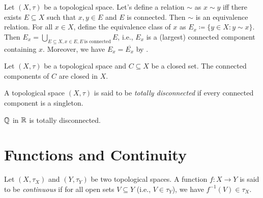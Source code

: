 \documentclass[screen]{techreport}
\numberwithin{equation}{section}
\begin{document}
\begin{definition}\label{De:ConnEquivalenceRelation}
	Let $(X,\tau)$ be a topological space.
	Let's define a relation ${\sim}$ as $x \sim y$ iff there exists $E \subseteq X$ such that $x,y\in E$ and $E$ is connected.
	Then ${\sim}$ is an equivalence relation.
	For all $x \in X$, define the equivalence class of $x$ as $E_x \coloneqq \{ y \in X : y \sim x \}$.
	Then $E_x = \bigcup_{E \subseteq X, x \in E, E~\text{is connected}} E$, i.e., $E_x$ is a (largest) connected component containing $x$.
	Moreover, we have $E_x = \overline{E_x}$ by .
\end{definition}

\begin{proposition}\label{Prop:ClosedConnComponentStillClosed}
	Let $(X,\tau)$ be a topological space and $C \subseteq X$ be a closed set.
	The connected components of $C$ are closed in $X$.
\end{proposition}

\begin{definition}\label{De:TotalDisconnectedness}
	A topological space $(X,\tau)$ is said to be \emph{totally disconnected} if every connected component is a singleton.
\end{definition}

\begin{example}\label{De:QInRIsTotallyDisconn}
	$\mathbb{Q}$ in $\mathbb{R}$ is totally disconnected.
\end{example}

\section{Functions and Continuity}

\begin{definition}\label{De:ContinuousFunctions}
	Let $(X,\tau_X)$ and $(Y,\tau_Y)$ be two topological spaces.
	A function $f : X \to Y$ is said to be \emph{continuous} if for all open sets $V \subseteq Y$ (i.e., $V \in \tau_Y$), we have $f^{-1}(V) \in \tau_X$.
\end{definition}
\end{document}
